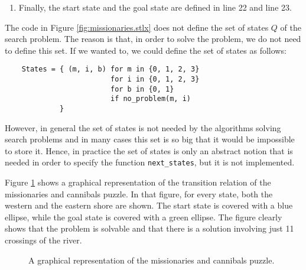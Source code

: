 \begin{enumerate}
      \hspace*{1.3cm}
      \texttt{(m + mb, i + ib, 1)}.
      \\[0.2cm]
      Here, \texttt{mb} is the number of missionaries arriving on the western shore and \texttt{ib} is the
      number of arriving infidels.
      As the number of missionaries on the eastern shore is $3 - \mathrm{m}$ and the number of infidels on the
      eastern shore is $3 - \mathrm{i}$, $\texttt{mb}$ has to be a member of the set $\{0,\cdots,3 -\mathtt{m}\}$, while
      $\texttt{ib}$ has to be a member of the set $\{0,\cdots,3 - \mathtt{i}\}$.
\item Finally, the start state and the goal state are defined in line 22 and line 23.
\end{enumerate}
The code in Figure \ref{fig:missionaries.stlx} does not define the set of states $Q$ of the search problem.  The
reason is that, in order to solve the problem, we do not need to define this set.  If we wanted to, we could
define the set of states as follows: 
\begin{verbatim}
    States = { (m, i, b) for m in {0, 1, 2, 3}
                         for i in {0, 1, 2, 3}
                         for b in {0, 1} 
                         if no_problem(m, i)
             }
\end{verbatim}
However, in general the set of states is not needed by the algorithms solving search problems and in many cases
this set is so big that it would be impossible to store it.  Hence, in practice the set of states is only an
abstract notion that is needed in order to specify the function \texttt{next\_states}, but it is not implemented.

Figure \ref{fig:missionaries.pdf} shows a graphical representation of the transition relation of the
missionaries and cannibals puzzle.  In that figure, for every state, both the western and the
eastern shore are shown.  The start state is covered with a blue ellipse, while the goal state is
covered with a green ellipse.  The figure clearly shows that the problem is solvable and that there
is a solution involving just 11 crossings of the river.
\eox

\begin{figure}[!ht]
  \centering
  \caption{A graphical representation of the missionaries and cannibals puzzle.}
  \label{fig:missionaries.pdf}
\end{figure}


